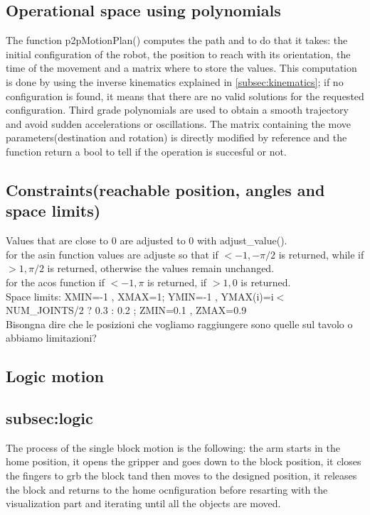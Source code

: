 \documentclass[12pt,a4paper]{article}
\begin{document}
\subsection{Operational space using polynomials}\label{subsec:opspace}
The function p2pMotionPlan() computes the path and to do that it takes: the initial configuration of the robot, the position to reach with its orientation, the time of the movement and a matrix where to store the values. This computation is done by using the inverse kinematics explained in \ref{subsec:kinematics}; if no configuration is found, it means that there are no valid solutions for the requested configuration. Third grade polynomials are used to obtain a smooth trajectory and avoid sudden accelerations or oscillations. The matrix containing the move parameters(destination and rotation) is directly modified by reference and the function return a bool to tell if the operation is succesful or not.

\subsection{Constraints(reachable position, angles and space limits)}\label{subsec:constraints}
Values that are close to 0 are adjusted to 0 with adjust\_value().\\
for the asin function values are adjuste so that if $<-1, -\pi/2$ is returned, while if $>1, \pi/2$ is returned, otherwise the values remain unchanged.\\
for the acos function if $<-1, \pi$ is returned, if $>1, 0$ is returned.\\
Space limits: XMIN=-1 , XMAX=1; YMIN=-1 , YMAX(i)=i$<$NUM\_JOINTS/2 ? 0.3 : 0.2 ; ZMIN=0.1 , ZMAX=0.9\\
Bisongna dire che le posizioni che vogliamo raggiungere sono quelle sul tavolo o abbiamo limitazioni?

\subsection{Logic motion}\subsection{subsec:logic}
The process of the single block motion is the following: the arm starts in the home position, it opens the gripper and goes down to the block position, it closes the fingers to grb the block tand then moves to the designed position, it releases the block and returns to the home ocnfiguration before resarting with the visualization part and iterating until all the objects are moved.
\end{document}
